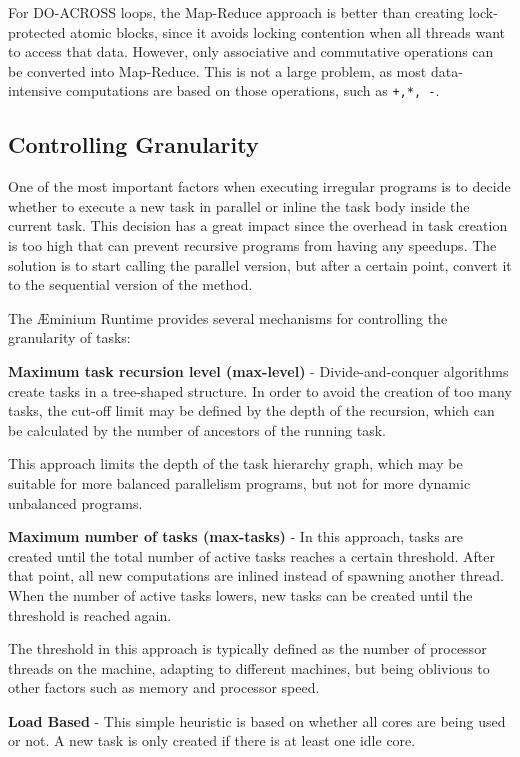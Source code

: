 \documentclass[smallextended]{svjour3}
\begin{document}
For DO-ACROSS loops, the Map-Reduce approach is better than creating lock-protected atomic blocks, since it avoids locking contention when all threads want to access that data. However, only associative and commutative operations can be converted into Map-Reduce. This is not a large problem, as most data-intensive computations are based on those operations, such as \lstinline|+,*, -|.


\subsection{Controlling Granularity}

One of the most important factors when executing irregular programs is to decide whether to execute a new task in parallel or inline the task body inside the current task. This decision has a great impact since the overhead in task creation is too high that can prevent recursive programs from having any speedups. The solution is to start calling the parallel version, but after a certain point, convert it to the sequential version of the method.

The Æminium Runtime provides several mechanisms for controlling the granularity of tasks:

\textbf{Maximum task recursion level (max-level)} - Divide-and-conquer algorithms create tasks in a tree-shaped structure. In order to avoid the creation of too many tasks, the cut-off limit may be defined by the depth of the recursion\cite{duran2008evaluation}, which can be calculated by the number of ancestors of the running task.

This approach limits the depth of the task hierarchy graph, which may be suitable for more balanced parallelism programs, but not for more dynamic unbalanced programs.

\textbf{Maximum number of tasks (max-tasks)} - In this approach, tasks are created until the total number of active tasks reaches a certain threshold\cite{duran2008evaluation}. After that point, all new computations are inlined instead of spawning another thread. When the number of active tasks lowers, new tasks can be created until the threshold is reached again.

The threshold in this approach is typically defined as the number of processor threads on the machine, adapting to different machines, but being oblivious to other factors such as memory and processor speed.

\textbf{Load Based} - This simple heuristic is based on whether all cores are being used or not. A new task is only created if there is at least one idle core\cite{duran2008adaptive}.
\end{document}
